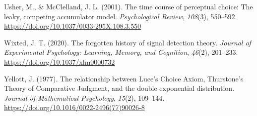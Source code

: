 \documentclass[
  man,
  floatsintext,
  longtable,
  a4paper,
  nolmodern,
  notxfonts,
  notimes,
  colorlinks=true,linkcolor=blue,citecolor=blue,urlcolor=blue]{apa7}
\newlength{\cslhangindent}
\newenvironment{CSLReferences}[2] %
 {\begin{list}{}{%
  \setlength{\itemindent}{0pt}
  \setlength{\leftmargin}{0pt}
  \setlength{\parsep}{0pt}
  \ifodd #1
   \setlength{\leftmargin}{\cslhangindent}
   \setlength{\itemindent}{-1\cslhangindent}
  \fi
  \setlength{\itemsep}{#2\baselineskip}}}
 {\end{list}}
\begin{document}
\begin{CSLReferences}{1}{0}
Usher, M., \& McClelland, J. L. (2001). The time course of perceptual
choice: {The} leaky, competing accumulator model. \emph{Psychological
Review}, \emph{108}(3), 550--592.
\url{https://doi.org/10.1037/0033-295X.108.3.550}

Wixted, J. T. (2020). The forgotten history of signal detection theory.
\emph{Journal of Experimental Psychology: Learning, Memory, and
Cognition}, \emph{46}(2), 201--233.
\url{https://doi.org/10.1037/xlm0000732}

Yellott, J. (1977). The relationship between {Luce}'s {Choice Axiom},
{Thurstone}'s {Theory} of {Comparative Judgment}, and the double
exponential distribution. \emph{Journal of Mathematical Psychology},
\emph{15}(2), 109--144.
\url{https://doi.org/10.1016/0022-2496(77)90026-8}

\end{CSLReferences}
\end{document}
